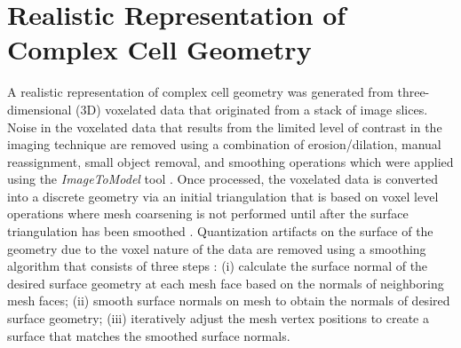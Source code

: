 \documentclass[]{interact}
\begin{document}
\section{Realistic Representation of Complex Cell Geometry}

A realistic representation of complex cell geometry was generated from three-dimensional (3D) voxelated data that originated from a stack of image slices. Noise in the voxelated data that results from the limited level of contrast in the imaging technique are removed using a combination of erosion/dilation, manual reassignment, small object removal, and smoothing operations which were applied using the \textit{ImageToModel} tool \citep{Klaas:2013ug, Klaas_conference, simmetrix}. Once processed, the voxelated data is converted into a discrete geometry via an initial triangulation that is based on voxel level operations where mesh coarsening is not performed until after the surface triangulation has been smoothed \citep{Klaas:2013ug}. Quantization artifacts on the surface of the geometry due to the voxel nature of the data are removed using a smoothing algorithm that consists of three steps \citep{Klaas:2013ug}: (i) calculate the surface normal of the desired surface geometry at each mesh face based on the normals of neighboring mesh faces; (ii) smooth surface normals on mesh to obtain the normals of desired surface geometry; (iii) iteratively adjust the mesh vertex positions to create a surface that matches the smoothed surface normals.
\end{document}
